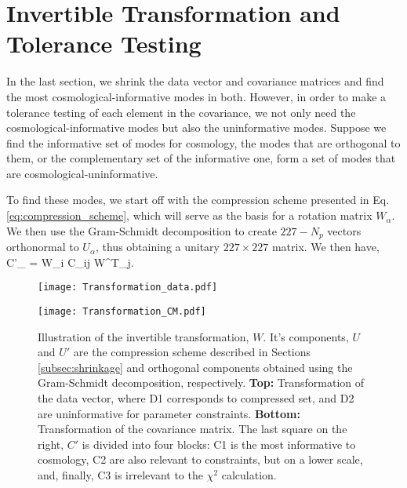 	\appendix
	\section{Invertible Transformation and Tolerance Testing}
	
	In the last section, we shrink the data vector and covariance matrices and find the most cosmological-informative modes in both. However, in order to make a tolerance testing of each element in the covariance, we not only need the cosmological-informative modes but also the uninformative modes. Suppose we find the informative set of modes for cosmology, the modes that are orthogonal to them, or the complementary set of the informative one, form a set of modes that are cosmological-uninformative. 
	
	To find these modes, we start off with the compression scheme presented in Eq. \ref{eq:compression_scheme}, which will serve as the basis for a rotation matrix $W_\alpha$. We then use the Gram-Schmidt decomposition to create $227 - N_p$ vectors orthonormal to $U_{\alpha}$, thus obtaining a unitary $227 \times 227$ matrix. We then have,
	\be
	C'_{\alpha\beta} = W_{\alpha i} C_{ij} W^T_{j\beta}.
	\ee
	
	\begin{figure}[]
		\texttt{[image: Transformation\_data.pdf]}
		
		\bigskip
		
		\texttt{[image: Transformation\_CM.pdf]}
		\caption{Illustration of the invertible transformation, $W$. It's components, $U$ and $U'$ are the compression scheme described in Sections \ref{subsec:shrinkage} and orthogonal components obtained using the Gram-Schmidt decomposition, respectively. \textbf{Top:} Transformation of the data vector, where D1 corresponds to compressed set, and D2 are uninformative for parameter constraints. \textbf{Bottom:} Transformation of the covariance matrix. The last square on the right, $C'$ is divided into four blocks: C1 is the most informative to cosmology, C2 are also relevant to constraints, but on a lower scale, and, finally, C3 is irrelevant to the $\chi^2$ calculation. \label{fig:transformation}}
	\end{figure}
	
